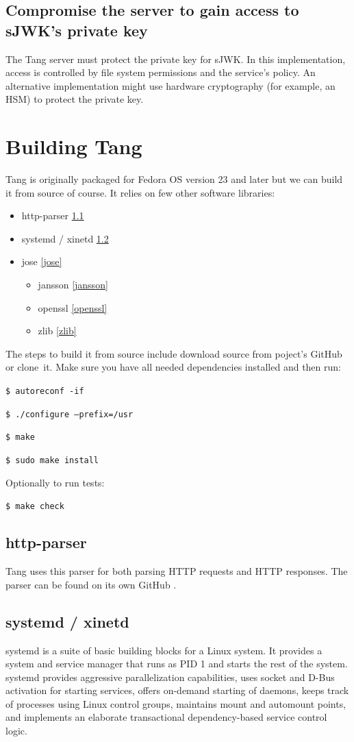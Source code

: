 \documentclass[../xdudla00-porting-Tang-to-Open-WRT.tex]{subfiles}
\begin{document}
\subsection{Compromise the server to gain access to sJWK's private key}
The Tang server must protect the private key for sJWK.
In this implementation, access is controlled by file system permissions and the service's policy.
An alternative implementation might use hardware cryptography (for example, an HSM) to protect the private key.
\section{Building Tang}

Tang is originally packaged for Fedora OS version 23 and later but we can build it from source of course.
It relies on few other software libraries:
\label{dependencies}
\begin{itemize}
\item http-parser \ref{http-parser}
\item systemd / xinetd \ref{systemd}
\item jose \ref{jose}
    \begin{itemize}
    \item jansson \ref{jansson}
    \item openssl \ref{openssl}
    \item zlib \ref{zlib}
    \end{itemize}
\end{itemize}

The steps to build it from source include download source from poject's GitHub or clone~it.
Make sure you have all needed dependencies installed and then run:

{\tt \$ autoreconf -if}

{\tt \$ ./configure --prefix=/usr}

{\tt \$ make}

{\tt \$ sudo make install}

Optionally to run tests:

{\tt \$ make check}

\subsection{http-parser}\label{http-parser}
Tang uses this parser for both parsing HTTP requests and HTTP responses.
The parser can be found on its own GitHub \cite{http-parser}.

\subsection{systemd / xinetd}\label{systemd}
systemd is a suite of basic building blocks for a Linux system.
It provides a system and service manager that runs as PID 1 and starts the rest of the system.
systemd provides aggressive parallelization capabilities, uses socket and D-Bus activation for starting services,
 offers on-demand starting of daemons, keeps track of processes using Linux control groups, maintains mount and automount points,
 and implements an elaborate transactional dependency-based service control logic.
\end{document}

